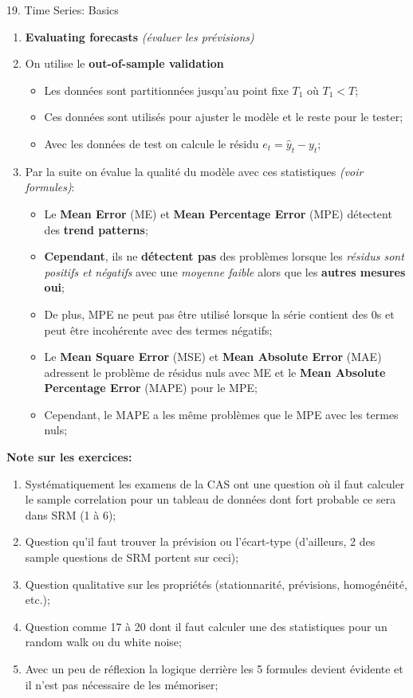 \documentclass[12pt, titlepage, french]{report}
\begin{document}
\begin{CHPT_SUMM}{19. Time Series: Basics}
\begin{enumerate}
	\texttt{[image: src/xbar-plots.png]}
	\item	\textbf{Evaluating forecasts} \textit{(évaluer les prévisions)}
	\item[]	On utilise le \textbf{out-of-sample validation}
		\begin{itemize}
		\item	Les données sont partitionnées jusqu'au point fixe $T_{1}$ où $T_{1} < T$;
		\item	Ces données sont utilisés pour ajuster le modèle et le reste pour le tester;
		\item	Avec les données de test on calcule le résidu $e_{t} = \hat{y}_{t} - y_{t}$;
		\end{itemize}
	\item[]	Par la suite on évalue la qualité du modèle avec ces statistiques \emph{(voir formules)}:
	\begin{itemize}
		\item	Le \textbf{Mean Error} (ME) et \textbf{Mean Percentage Error} (MPE) détectent des \textbf{trend patterns};
		\item	\textbf{Cependant}, ils ne \textbf{détectent pas} des problèmes lorsque les \textit{résidus sont positifs et négatifs} avec une \textit{moyenne faible} alors que les \textbf{autres mesures oui};
		\item	De plus, MPE ne peut pas être utilisé lorsque la série contient des 0s et peut être incohérente avec des termes négatifs;
		\item	Le \textbf{Mean Square Error} (MSE) et \textbf{Mean Absolute Error} (MAE) adressent le problème de résidus nuls avec ME et le \textbf{Mean Absolute Percentage Error} (MAPE) pour le MPE;
		\item	Cependant, le MAPE a les même problèmes que le MPE avec les termes nuls;
	\end{itemize}
\end{enumerate}
\textbf{Note sur les exercices:} 
\begin{enumerate}
	\item	Systématiquement les examens de la CAS ont une question où il faut calculer le sample correlation pour un tableau de données dont fort probable ce sera dans SRM (1 à 6);
	\item	Question qu'il faut trouver la prévision ou l'écart-type (d'ailleurs, 2 des sample questions de SRM portent sur ceci);
	\item	Question qualitative sur les propriétés (stationnarité, prévisions, homogénéité, etc.);
	\item	Question comme 17 à 20 dont il faut calculer une des statistiques pour un random walk ou du white noise;
	\item	Avec un peu de réflexion la logique derrière les 5 formules devient évidente et il n'est pas nécessaire de les mémoriser;
\end{enumerate}
\end{CHPT_SUMM}
\end{document}

